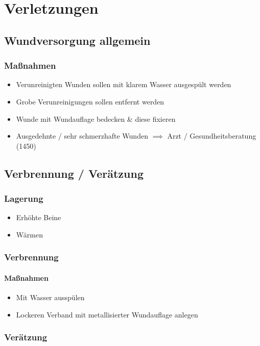 \part{Verletzungen}

\chapter{Wundversorgung allgemein}
\section*{Maßnahmen}
\begin{itemize}
    \item Verunreinigten Wunden sollen mit klarem Wasser ausgespült werden
    \item Grobe Verunreinigungen sollen entfernt werden
    \item Wunde mit Wundauflage bedecken \& diese fixieren
    \item Ausgedehnte / sehr schmerzhafte Wunden $\implies$ Arzt / Gesundheitsberatung (1450)
\end{itemize}

\chapter{Verbrennung / Verätzung}
\section{Lagerung}
\begin{itemize}
    \item Erhöhte Beine
    \item Wärmen
\end{itemize}

\section{Verbrennung}
\subsection*{Maßnahmen}
\begin{itemize}
    \item Mit Wasser ausspülen
    \item Lockeren Verband mit metallisierter Wundauflage anlegen
\end{itemize}

\section{Verätzung}
